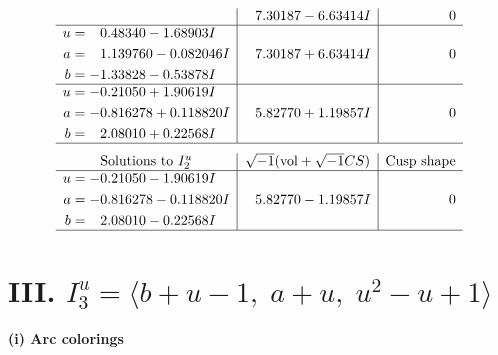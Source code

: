 \documentclass[1p]{elsarticle_modified}
\theoremstyle{definition}
\newcommand{\I}{\sqrt{-1}}
\begin{document}
$$\begin{array}{c|c|c}
 & \phantom{-}7.30187 - 6.63414 I & \phantom{-0.000000 } 0 \\ \hline\begin{aligned}
u &= \phantom{-}0.48340 - 1.68903 I \\
a &= \phantom{-}1.139760 - 0.082046 I \\
b &= -1.33828 - 0.53878 I\end{aligned}
 & \phantom{-}7.30187 + 6.63414 I & \phantom{-0.000000 } 0 \\ \hline\begin{aligned}
u &= -0.21050 + 1.90619 I \\
a &= -0.816278 + 0.118820 I \\
b &= \phantom{-}2.08010 + 0.22568 I\end{aligned}
 & \phantom{-}5.82770 + 1.19857 I & \phantom{-0.000000 } 0\\
 \hline 
 \end{array}$$\newpage$$\begin{array}{c|c|c}  
\text{Solutions to }I^u_{2}& \I (\text{vol} + \sqrt{-1}CS) & \text{Cusp shape}\\
 \hline 
\begin{aligned}
u &= -0.21050 - 1.90619 I \\
a &= -0.816278 - 0.118820 I \\
b &= \phantom{-}2.08010 - 0.22568 I\end{aligned}
 & \phantom{-}5.82770 - 1.19857 I & \phantom{-0.000000 } 0\\
 \hline 
 \end{array}$$\newpage\newpage\renewcommand{\arraystretch}{1}
\centering \section*{III. $I^u_{3}= \langle b+u-1,\;a+u,\;u^2- u+1 \rangle$}
\flushleft \textbf{(i) Arc colorings}\\
\end{document}
